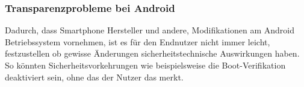 \subsubsection{Transparenzprobleme bei Android}
Dadurch, dass Smartphone Hersteller und andere, Modifikationen am Android Betriebssystem vornehmen, ist es für den Endnutzer nicht immer leicht, festzustellen ob gewisse Änderungen sicherheitstechnische Auswirkungen haben. So könnten Sicherheitsvorkehrungen wie beispielsweise die Boot-Verifikation deaktiviert sein, ohne das der Nutzer das merkt.